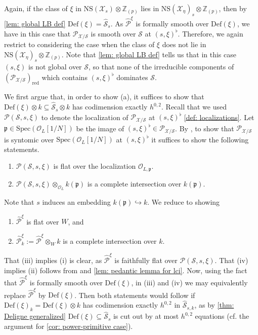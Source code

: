 \documentclass[letter, 11pt]{article}
\theoremstyle{plain}
\theoremstyle{definition}
\newcommand{\IZ}{\mathbb{Z}}
\newcommand{\Spec}{\mathrm{Spec}}
\newcommand\tensor{{\otimes}}
\newcommand{\<}{\langle}
\renewcommand{\>}{\rangle}
\newcommand{\into}{\hookrightarrow}
\newcommand{\fp}{\mathfrak{p}}
\newcommand{\sX}{\mathcal{X}}
\newcommand{\sS}{\mathcal{S}}
\newcommand{\sO}{\mathcal{O}}
\newcommand{\shP}{\mathscr{P}}
\newcommand{\Def}{\mathrm{Def}}
\newcommand{\NS}{\mathrm{NS}}
\newcommand{\red}{\mathrm{red}}
\begin{document}
Again, if the class of $\xi$ in $\NS(\sX_s) \tensor \IZ_{(p)}$ lies in $\NS(\sX_\eta)_s \tensor \IZ_{(p)}$, then by \ref{lem: global LB def} $\Def(\xi) = \hat{\sS}_s$. As $\hat{\shP}^\xi$ is formally smooth over $\Def(\xi)$, we have in this case that $\shP_{\sX/\sS}$ is smooth over $\sS$ at $(s, \xi)^\flat$. Therefore, we again restrict to considering the case when the class of $\xi$ does not lie in $\NS(\sX_\eta)_s \tensor \IZ_{(p)}$. Note that \ref{lem: global LB def} tells us that in this case $(s, \xi)$ is not global over $\sS$, so that none of the irreducible components of $(\shP_{\sX/\sS})_\red$ which contains $(s, \xi)^\flat$ dominates $\sS$. 

We first argue that, in order to show (a), it suffices to show that $\Def(\xi) \tensor k \subseteq \hat{\sS}_s \tensor k$ has codimension exactly $h^{0, 2}$. Recall that we used $\shP(\sS, s, \xi)$ to denote the localization of $\shP_{\sX/\sS}$ at $(s, \xi)^\flat$ \ref{def: localizations}. Let $\fp \in \Spec(\sO_L[1/N])$ be the image of $(s, \xi)^\flat \in \shP_{\sX/\sS}$. By \cite[01UE]{stacks-project}, to show that $\shP_{\sX/\sS}$ is syntomic over $\Spec(\sO_L[1/N])$ at $(s, \xi)^\flat$ it suffices to show the following statements. 


\begin{enumerate}[label=\upshape{(\roman*)}]
    \item $\shP(\sS, s, \xi)$ is flat over the localization 
     $\sO_{L, \fp}$. 
    \item $\shP(\sS,s, \xi) \tensor_{\sO_L} k(\fp)$ is a complete intersection over $k(\fp)$. 
\end{enumerate}
Note that $s$ induces an embedding $k(\fp) \into k$. We reduce to showing 
\begin{enumerate}[label=\upshape{(\roman*)}]
    \item[(iii)] $\hat{\shP}^\xi$ is flat over $W$, and 
    \item[(iv)] $\hat{\shP}^\xi_k := \hat{\shP}^\xi \tensor_W k$ is a complete intersection over $k$. 
\end{enumerate}
That (iii) implies (i) is clear, as $\hat{\shP}^\xi$ is faithfully flat over $\shP(\sS, s, \xi)$. That (iv) implies (ii) follows from \cite[00SI]{stacks-project} and \ref{lem: pedantic lemma for lci}. Now, using the fact that $\hat{\shP}^\xi$ is formally smooth over $\Def(\xi)$, in (iii) and (iv) we may equivalently replace $\hat{\shP}^\xi$ by $\Def(\xi)$. Then both statements would follow if $\Def(\xi)_k = \Def(\xi) \tensor k$ has codimension exactly $h^{0, 2}$ in $\hat{\sS}_{s, k}$, as by \ref{thm: Deligne generalized} $\Def(\xi) \subseteq \hat{\sS}_s$ is cut out by at most $h^{0, 2}$ equations (cf. the argument for \ref{cor: power-primitive case}). 
\end{document}
